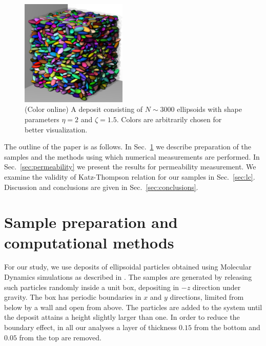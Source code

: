\documentclass[aps,twocolumn,superscriptaddress,showpacs,showkeys]{revtex4}
\begin{document}
\begin{figure}
\begin{center}
\includegraphics*[width=0.45\textwidth,angle=0]{fig1}
\caption{\protect
            (Color online)
            A deposit consisting of $N\sim 3000 $ ellipsoids 
            with shape parameters $\eta=2$ and $\zeta=1.5$.
            Colors are arbitrarily chosen for better visualization.}
\label{fig:deposit}
\end{center}
\end{figure}
 
The outline of the paper is as follows. 
In Sec.~\ref{sec:simulations} we describe preparation of the samples 
and the methods using which numerical measurements are performed.
In Sec.~\ref{sec:permeability} we present the results for permeability measurement. 
We examine the validity of Katz-Thompson relation for our samples in Sec.~\ref{sec:lc}.  
Discussion and conclusions are given in Sec.~\ref{sec:conclusions}.


\section{Sample preparation and computational methods}
\label{sec:simulations}
For our study, we use deposits of ellipsoidal particles obtained using 
Molecular Dynamics simulations as described in \cite{ref:reza-pedro2011}.
The samples are generated by releasing such particles randomly inside a unit box, 
depositing in $-z$ direction under gravity. The box has periodic boundaries in $x$ and $y$ 
directions, limited from below by a wall and open from above. The particles are 
added to the system until the deposit attains a height slightly larger than one. 
In order to reduce the boundary effect, in all our analyses a layer of thickness $0.15$ 
from the bottom and $0.05$ from the top are removed.
\end{document}
